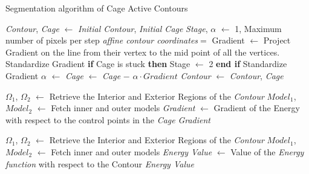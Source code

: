 \begin{algorithm}[h]
	\small
	\caption{Segmentation algorithm of Cage Active Contours}\label{alg:cac_algorithm}
	\begin{algorithmic}[1]
		\label{cac:line:segment_object}
		\State \textit{Contour}, \textit{Cage}  $\leftarrow$ \textit{Initial Contour}, \textit{Initial Cage}
		\State \textit{Stage}, $\alpha$ $\leftarrow$ 1, Maximum number of pixels per step
		\State \textit{affine contour coordinates}$=$\label{cac:line:get_affine_coord} 
		\State Gradient $\leftarrow$ 
		 \label{cac:line:stage_1}
		\State Project Gradient on the line from their vertex to the mid point of all the vertices.
		\State Standardize Gradient
		\State \textbf{if} Cage is stuck \textbf{then} Stage $\leftarrow$ 2 \textbf{end if}
		\Else\label{cac:line:stage_2}
		\State Standardize Gradient
		\State $\alpha$ $\leftarrow$ 
		\EndIf\label{cac:line:end_stages}
		\State \textit{Cage} $\leftarrow$ \textit{Cage} $-$ $\alpha \cdot Gradient$ 
		\State \textit{Contour} $\leftarrow$  \label{cac:line:deform_contour}
		\EndWhile
		\State \Return \textit{Contour}, \textit{Cage}
		\EndProcedure \label{cac:line:end_segment_object}
		
		\Statex
		\State $\Omega_1$, $\Omega_2$  $\leftarrow$ Retrieve the Interior and Exterior Regions of the \textit{Contour}
		\State $Model_1$, $Model_2$ $\leftarrow$ Fetch inner and outer models
		\State \textit{Gradient} $\leftarrow$ Gradient of the Energy with respect to the control points in the \textit{Cage}
		\State \Return \textit{Gradient}
		\EndFunction
		
		\Statex
		\State $\Omega_1$, $\Omega_2$  $\leftarrow$ Retrieve the Interior and Exterior Regions of the \textit{Contour}
		\State $Model_1$, $Model_2$ $\leftarrow$ Fetch inner and outer models
		\State \textit{Energy Value} $\leftarrow$ Value of the \textit{Energy function} with respect to the Contour
		\State \Return \textit{Energy Value}
		\EndFunction
		

\end{algorithmic}
\end{algorithm}
